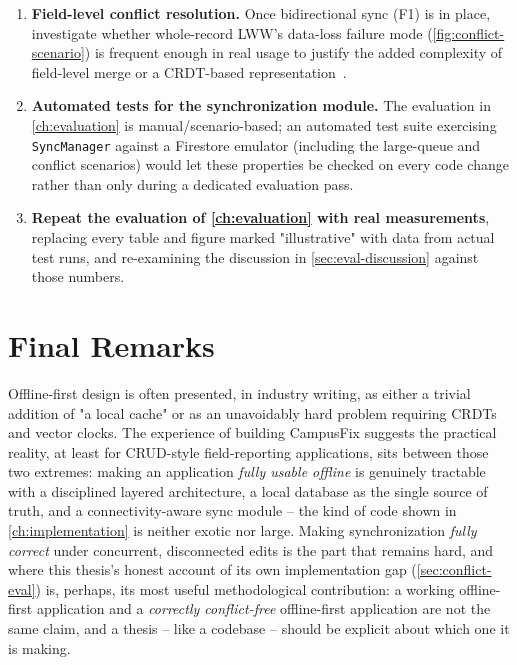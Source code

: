 \begin{enumerate}[label=\textbf{F\arabic*.}]
  for the case where connectivity returns while the app is not in the
  foreground.
  \item \textbf{Field-level conflict resolution.} Once bidirectional sync
  (F1) is in place, investigate whether whole-record LWW's
  data-loss failure mode (\cref{fig:conflict-scenario}) is frequent enough
  in real usage to justify the added complexity of field-level merge or a
  CRDT-based representation~\cite{shapiro2011crdt}.
  \item \textbf{Automated tests for the synchronization module.} The
  evaluation in \cref{ch:evaluation} is manual/scenario-based; an
  automated test suite exercising \texttt{SyncManager} against a Firestore
  emulator (including the large-queue and conflict scenarios) would let
  these properties be checked on every code change rather than only during
  a dedicated evaluation pass.
  \item \textbf{Repeat the evaluation of \cref{ch:evaluation} with real
  measurements}, replacing every table and figure marked
  "illustrative" with data from actual test runs, and re-examining the
  discussion in \cref{sec:eval-discussion} against those numbers.
\end{enumerate}

\section{Final Remarks}
\label{sec:final-remarks}

Offline-first design is often presented, in industry writing, as either a
trivial addition of "a local cache" or as an unavoidably hard problem
requiring CRDTs and vector clocks. The experience of building CampusFix
suggests the practical reality, at least for CRUD-style field-reporting
applications, sits between those two extremes: making an application
\emph{fully usable offline} is genuinely tractable with a disciplined
layered architecture, a local database as the single source of truth, and
a connectivity-aware sync module -- the kind of code shown in
\cref{ch:implementation} is neither exotic nor large. Making
synchronization \emph{fully correct} under concurrent, disconnected edits
is the part that remains hard, and where this thesis's honest account of
its own implementation gap (\cref{sec:conflict-eval}) is, perhaps, its
most useful methodological contribution: a working offline-first
application and a \emph{correctly conflict-free} offline-first
application are not the same claim, and a thesis -- like a codebase --
should be explicit about which one it is making.
